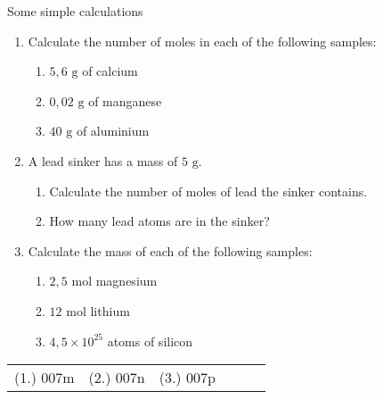             \begin{exercises} {Some simple calculations}
            \nopagebreak \noindent \vspace{-2cm}
      \label{m38717*id278090}\begin{enumerate}[noitemsep, label=\textbf{\arabic*}. ] 
            \label{m38717*uid24}\item Calculate the number of moles in each of the following samples:
\label{m38717*id278106}\begin{enumerate}[noitemsep, label=\textbf{\alph*}. ] 
            \label{m38717*uid25}\item $5,6 \text{ g}$ of calcium
\label{m38717*uid26}\item $0,02 \text{ g}$ of manganese
\label{m38717*uid27}\item $40\text{ g}$ of aluminium
\end{enumerate}
               \label{m38717*uid28}\item A lead sinker has a mass of $5 \text{ g}$.
\label{m38717*id278159}\begin{enumerate}[noitemsep, label=\textbf{\alph*}. ] 
            \label{m38717*uid29}\item Calculate the number of moles of lead the sinker contains.
\label{m38717*uid30}\item How many lead atoms are in the sinker?
\end{enumerate}
                \label{m38717*uid31}\item Calculate the mass of each of the following samples:
\label{m38717*id278201}\begin{enumerate}[noitemsep, label=\textbf{\alph*}. ] 
            \label{m38717*uid32}\item $2,5\text{ mol}$ magnesium
\label{m38717*uid33}\item $12 \text{ mol}$ lithium
\label{m38717*uid34}\item $4,5 \times 10^{25}$ atoms of silicon
\end{enumerate}
                \end{enumerate}
\practiceinfo
\par 
 \par \begin{tabular}[h]{cccccc}
 (1.) 007m  &  (2.) 007n  &  (3.) 007p  & \end{tabular}
\end{exercises}
